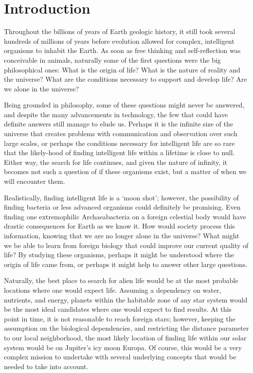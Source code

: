 \chapter{Introduction} %


Throughout the billions of years of Earth geologic history, it still took several hundreds of millions of years before evolution allowed for complex, intelligent organisms to inhabit the Earth. As soon as free thinking and self-reflection was conceivable in animals, naturally some of the first questions were the big philosophical ones: What is the origin of life? What is the nature of reality and the universe? What are the conditions necessary to support and develop life? Are we alone in the universe?

Being grounded in philosophy, some of these questions might never be answered, and despite the many advancements in technology, the few that could have definite answers still manage to elude us. Perhaps it is the infinite size of the universe that creates problems with communication and observation over such large scales, or perhaps the conditions necessary for intelligent life are so rare that the likely-hood of finding intelligent life within a lifetime is close to null. Either way, the search for life continues, and given the nature of infinity, it becomes not such a question of if these organisms exist, but a matter of when we will encounter them.

Realistically, finding intelligent life is a `moon shot'; however, the possibility of finding bacteria or less advanced organisms could definitely be promising. Even finding one extremophilic Archaeabacteria on a foreign celestial body would have drastic consequences for Earth as we know it. How would society process this information, knowing that we are no longer alone in the universe? What might we be able to learn from foreign biology that could improve our current quality of life? By studying these organisms, perhaps it might be understood where the origin of life came from, or perhaps it might help to  answer other large questions.

Naturally, the best place to search for alien life would be at the most probable locations where one would expect life. Assuming a dependency on water, nutrients, and energy, planets within the habitable zone of any star system would be the most ideal candidates where one would expect to find results. At this point in time, it is not reasonable to reach foreign stars; however, keeping the assumption on the biological dependencies, and restricting the distance parameter to our local neighborhood, the most likely location of finding life within our solar system would be on Jupiter's icy moon Europa. Of course, this would be a very complex mission to undertake with several underlying concepts that would be needed to take into account.

